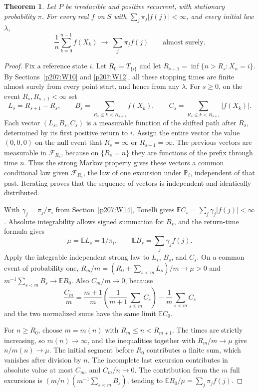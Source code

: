 \documentclass[11pt,oneside,openany]{book}
\theoremstyle{plain}
\newtheorem{theorem}{Theorem}[chapter]
\theoremstyle{definition}
\theoremstyle{remark}
\begin{document}
\begin{theorem}
Let \(P\) be irreducible and positive recurrent, with stationary
probability \(\pi\). For every real \(f\) on \(S\) with
\(\sum_j\pi_j|f(j)|<\infty\), and every initial law \(\lambda\),
\[
 \frac1n\sum_{k=0}^{n-1}f(X_k)
 \ \longrightarrow\ \sum_j\pi_j f(j)
 \qquad\text{almost surely}.
\]
\end{theorem}
\begin{proof}
Fix a reference state \(i\).
Let \(R_0=T_{\{i\}}\) and let
\(R_{s+1}=\inf\{n>R_s:X_n=i\}\).
By Sections~\ref{p207:W10} and \ref{p207:W12}, all these
stopping times are finite almost surely from every point start,
and hence from any \(\lambda\).
For \(s\ge0\), on the event \(R_s,R_{s+1}<\infty\) set
\[
 L_s=R_{s+1}-R_s,\qquad
 B_s=\sum_{R_s\le k<R_{s+1}}f(X_k),\qquad
 C_s=\sum_{R_s\le k<R_{s+1}}|f(X_k)|.
\]
Each vector \((L_s,B_s,C_s)\) is a measurable function of the
shifted path after \(R_s\), determined by its first positive
return to \(i\). Assign the entire vector the value \((0,0,0)\)
on the null event that \(R_s=\infty\) or \(R_{s+1}=\infty\).
The previous vectors are measurable
in \(\mathcal F_{R_s}\), because on \(\{R_s=n\}\) they are
functions of the prefix through time \(n\). Thus the strong Markov
property gives these vectors a common conditional law given
\(\mathcal F_{R_s}\), the law of one excursion under
\(\mathbb P_i\), independent of that past. Iterating proves that
the sequence of vectors is independent and identically distributed.

With \(\gamma_j=\pi_j/\pi_i\) from Section~\ref{p207:W14}, Tonelli
gives \(\mathbb E C_s=\sum_j\gamma_j|f(j)|<\infty\).
Absolute integrability allows signed summation for \(B_s\),
and the return-time formula gives
\[
 \mu=\mathbb E L_s=1/\pi_i,\qquad
 \mathbb E B_s=\sum_j\gamma_j f(j).
\]
Apply the integrable independent strong law
\cite[Theorem \texttt{thm:etemadi}]{P105} to \(L_s\), \(B_s\),
and \(C_s\). On a common event of probability one,
\(R_m/m=(R_0+\sum_{s<m}L_s)/m\to\mu>0\) and
\(m^{-1}\sum_{s<m}B_s\to\mathbb E B_0\).
Also \(C_m/m\to0\), because
\[
 \frac{C_m}{m}
  =\frac{m+1}{m}\left(\frac1{m+1}\sum_{s\le m}C_s\right)
     -\frac1m\sum_{s<m}C_s
\]
and the two normalized sums have the same limit \(\mathbb E C_0\).

For \(n\ge R_0\), choose \(m=m(n)\) with \(R_m\le n<R_{m+1}\).
The times are strictly increasing, so \(m(n)\to\infty\), and
the inequalities together with \(R_m/m\to\mu\) give
\(n/m(n)\to\mu\). The initial segment before \(R_0\) contributes
a finite sum, which vanishes after division by \(n\).
The incomplete last excursion contributes in absolute value at
most \(C_m\), and \(C_m/n\to0\).
The contribution from the \(m\) full excursions is
\((m/n)(m^{-1}\sum_{s<m} B_s)\), tending to
\(\mathbb E B_0/\mu=\sum_j\pi_j f(j)\).
\end{proof}
\end{document}
